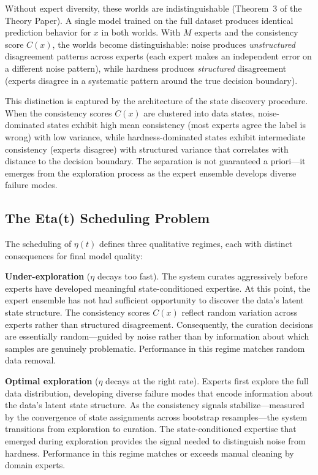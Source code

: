 \documentclass{article}
\begin{document}
Without expert diversity, these worlds are indistinguishable (Theorem~3 of the Theory Paper). A single model trained on the full dataset produces identical prediction behavior for $x$ in both worlds. With $M$ experts and the consistency score $C(x)$, the worlds become distinguishable: noise produces \emph{unstructured} disagreement patterns across experts (each expert makes an independent error on a different noise pattern), while hardness produces \emph{structured} disagreement (experts disagree in a systematic pattern around the true decision boundary).

This distinction is captured by the architecture of the state discovery procedure. When the consistency scores $C(x)$ are clustered into data states, noise-dominated states exhibit high mean consistency (most experts agree the label is wrong) with low variance, while hardness-dominated states exhibit intermediate consistency (experts disagree) with structured variance that correlates with distance to the decision boundary. The separation is not guaranteed a priori---it emerges from the exploration process as the expert ensemble develops diverse failure modes.

\subsection{The Eta(t) Scheduling Problem}
\label{sec:scheduling}

The scheduling of $\eta(t)$ defines three qualitative regimes, each with distinct consequences for final model quality:

\textbf{Under-exploration} ($\eta$ decays too fast). The system curates aggressively before experts have developed meaningful state-conditioned expertise. At this point, the expert ensemble has not had sufficient opportunity to discover the data's latent state structure. The consistency scores $C(x)$ reflect random variation across experts rather than structured disagreement. Consequently, the curation decisions are essentially random---guided by noise rather than by information about which samples are genuinely problematic. Performance in this regime matches random data removal.

\textbf{Optimal exploration} ($\eta$ decays at the right rate). Experts first explore the full data distribution, developing diverse failure modes that encode information about the data's latent state structure. As the consistency signals stabilize---measured by the convergence of state assignments across bootstrap resamples---the system transitions from exploration to curation. The state-conditioned expertise that emerged during exploration provides the signal needed to distinguish noise from hardness. Performance in this regime matches or exceeds manual cleaning by domain experts.
\end{document}
